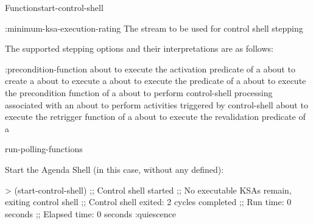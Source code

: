 \documentclass[10pt,twoside,english,pdftex]{article}
\begin{document}
\begin{functiondoc}{Function}{start-control-shell}
\begin{keywords}{:minimum-ksa-execution-rating}
   The stream to be used for control shell stepping

\end{keywords}


%
%
%
The supported stepping options and their interpretations are as follows:
\begin{keywords}{:precondition-function}
 about to execute the activation
predicate of a 
\keyword[:ks-activation] about to create a 
 about to execute a 
 about to execute the 
predicate of a 
 about to execute the precondition
function of a  
 about to perform control-shell processing
associated with an 
\keyword[:quiescence] about to perform activities triggered by 
control-shell  
 about to execute the retrigger
function of a  
 about to execute the revalidation predicate
of a  
\end{keywords}


\begin{alsos}{run-polling-functions}
\end{alsos}

\fnexamples
Start the Agenda Shell (in this case, without any  defined):
\begin{example}
> (start-control-shell)
;; Control shell started
;; No executable KSAs remain, exiting control shell
;; Control shell exited: 2 cycles completed
;; Run time: 0 seconds
;; Elapsed time: 0 seconds
:quiescence
\end{example}


\end{functiondoc}
\end{document}
